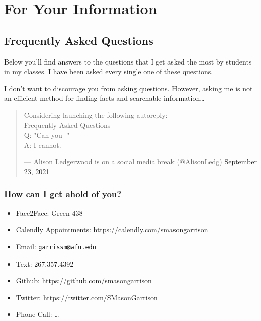 \documentclass[
]{book}
\begin{document}
\hypertarget{part-for-your-information}{%
\part*{For Your Information}\label{part-for-your-information}}

\hypertarget{frequently-asked-questions}{%
\chapter{Frequently Asked Questions}\label{frequently-asked-questions}}

Below you'll find answers to the questions that I get asked the most by students in my classes. I have been asked every single one of these questions.

I don't want to discourage you from asking questions. However, asking me is not an efficient method for finding facts and searchable information\ldots{}

\begin{quote}
Considering launching the following autoreply:\\
Frequently Asked Questions\\
Q: "Can you -"\\
A: I cannot.

--- Alison Ledgerwood is on a social media break (@AlisonLedg)
\href{https://twitter.com/AlisonLedg/status/1441181845706579969}{September 23,
2021}
\end{quote}

\hypertarget{how-can-i-get-ahold-of-you}{%
\section{How can I get ahold of you?}\label{how-can-i-get-ahold-of-you}}

\begin{itemize}
\item
  Face2Face: Green 438
\item
  Calendly Appointments: \url{https://calendly.com/smasongarrison}
\item
  Email: \href{mailto:garrissm@wfu.edu}{\nolinkurl{garrissm@wfu.edu}}
\item
  Text: 267.357.4392
\item
  Github: \url{https://github.com/smasongarrison}
\item
  Twitter: \url{https://twitter.com/SMasonGarrison}
\item
  Phone Call: \ldots{}
\end{itemize}
\end{document}
